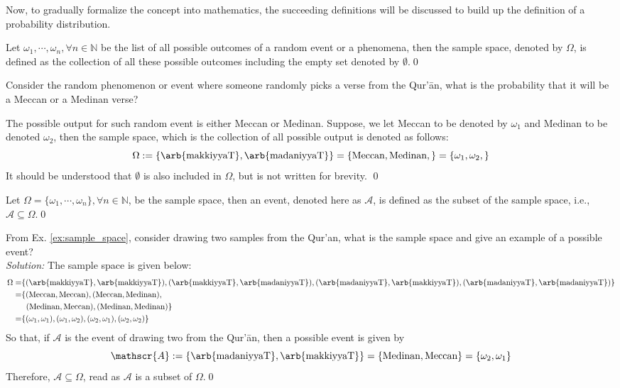 Now, to gradually formalize the concept into mathematics, the succeeding definitions will be discussed to build up the definition of a probability distribution.
\begin{defnx}
Let $\omega_1,\cdots,\omega_n, \forall n\in\mathbb{N}$ be the list of all possible outcomes of a random event or a phenomena, then the sample space, denoted by $\Omega$, is defined as the collection of all these possible outcomes including the empty set denoted by $\emptyset$.\qed
\end{defnx}
\begin{exmpx}\label{ex:sample_space}
Consider the random phenomenon or event where someone randomly picks a verse from the Qur'\=an, what is the probability that it will be a Meccan  or a Medinan  verse?

The possible output for such random event is either Meccan or Medinan. Suppose, we let Meccan to be denoted by $\omega_1$ and Medinan to be denoted $\omega_2$, then the sample space, which is the collection of all possible output is denoted as follows:
\begin{equation}\label{ex_eq:sample_space}
    \Omega:=\{\text{\arb{makkiyyaT}},\text{\arb{madaniyyaT}}\}=\{\text{Meccan}, \text{Medinan},\}=\{\omega_1,\omega_2,\}
\end{equation}
It should be understood that $\emptyset$ is also included in $\Omega$, but is not written for brevity.
\qed
\end{exmpx}
\begin{defnx}[Event]
Let $\Omega=\{\omega_1,\cdots,\omega_n\}, \forall n\in\mathbb{N}$, be the sample space, then an event, denoted here as $\mathscr{A}$, is defined as the subset of the sample space, i.e., $\mathscr{A}\subseteq{\Omega}$.\qed
\end{defnx}
\begin{exmpx}
From Ex. \ref{ex:sample_space}, consider drawing two samples from the Qur'an, what is the sample space and give an example of a possible event?\\
\textit{Solution:} The sample space is given below:
\begin{align}
    \Omega=&\{(\text{\arb{makkiyyaT}},\text{\arb{makkiyyaT}}),(\text{\arb{makkiyyaT}},\text{\arb{madaniyyaT}}), (\text{\arb{madaniyyaT}}, \text{\arb{makkiyyaT}}), (\text{\arb{madaniyyaT}}, \text{\arb{madaniyyaT}})\}\nonumber\\
    =&\{(\text{Meccan},\text{Meccan}),(\text{Meccan},\text{Medinan}), \\
    &\;\;(\text{Medinan},\text{Meccan}), (\text{Medinan},\text{Medinan})\}\\
    =&\{(\omega_1,\omega_1),(\omega_1,\omega_2),(\omega_2,\omega_1),(\omega_2,\omega_2)\}
\end{align}
So that, if $\mathscr{A}$ is the event of drawing two   from the Qur'\=an, then a possible event is given by 
\begin{equation}
    \mathscr{A}:=\{\text{\arb{madaniyyaT}}, \text{\arb{makkiyyaT}}\}=\{\text{Medinan}, \text{Meccan}\}=\{\omega_2,\omega_1\}
\end{equation}
Therefore, $\mathscr{A}\subseteq\Omega$, read as $\mathscr{A}$ is a subset of $\Omega$.\qed
\end{exmpx}
